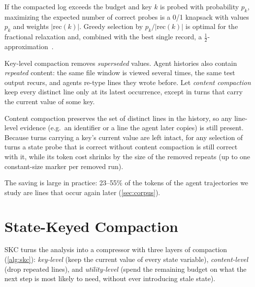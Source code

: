 \begin{proposition}
\label{prop:knapsack}
If the compacted log exceeds the budget and key $k$ is probed with probability
$p_k$, maximizing the expected number of correct probes is a 0/1 knapsack with
values $p_k$ and weights $|\mathrm{rec}(k)|$. Greedy selection by
$p_k/|\mathrm{rec}(k)|$ is optimal for the fractional relaxation and, combined
with the best single record, a $\tfrac12$-approximation~\citep{dantzig1957knapsack}.
\end{proposition}

Key-level compaction removes \emph{superseded} values. Agent histories also
contain \emph{repeated} content: the same file window is viewed several times,
the same test output recurs, and agents re-type lines they wrote before. Let
\emph{content compaction} keep every distinct line only at its latest
occurrence, except in turns that carry the current value of some key.

\begin{proposition}
\label{prop:dedup}
Content compaction preserves the set of distinct lines in the history, so any
line-level evidence (e.g.\ an identifier or a line the agent later copies) is
still present. Because turns carrying a key's current value are left intact,
for any selection of turns a state probe that is correct without content
compaction is still correct with it, while its token cost shrinks by the size of
the removed repeats (up to one constant-size marker per removed run).
\end{proposition}

The saving is large in practice: 23--55\% of the tokens of the agent
trajectories we study are lines that occur again later (\cref{sec:corpus}).

\section{State-Keyed Compaction}
\label{sec:method}

SKC turns the analysis into a compressor with three layers of compaction
(\cref{alg:skc}): \emph{key-level} (keep the current value of every state
variable), \emph{content-level} (drop repeated lines), and \emph{utility-level}
(spend the remaining budget on what the next step is most likely to need,
without ever introducing stale state).


